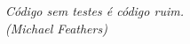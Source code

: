 
\renewcommand{\epigraphname}{EPÍGRAFE}

\begin{epigrafe}

\textit{Código sem testes é código ruim.\\
(Michael Feathers)}

\end{epigrafe}


